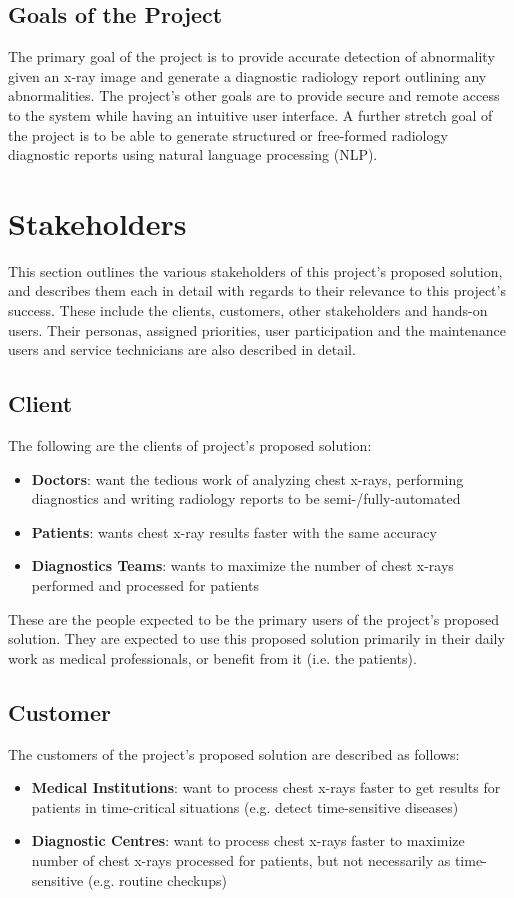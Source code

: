 \documentclass[12pt]{article}
\begin{document}
\subsection{Goals of the Project}
The primary goal of the project is to provide accurate detection of abnormality given an x-ray image and generate a diagnostic radiology report outlining any abnormalities. The project's other goals are to provide secure and remote access to the system while having an intuitive user interface. A further stretch goal of the project is to be able to generate structured or free-formed radiology diagnostic reports using natural language processing (NLP).

\section{Stakeholders}
This section outlines the various stakeholders of this project's proposed solution, and describes them each in detail with regards to their relevance to this project's success. These include the clients, customers, other stakeholders and hands-on users. Their personas, assigned priorities, user participation and the maintenance users and service technicians are also described in detail.

\subsection{Client}
The following are the clients of project's proposed solution:
\begin{itemize}
    \item \textbf{Doctors}: want the tedious work of analyzing chest x-rays, performing diagnostics and writing radiology reports to be semi-/fully-automated
    \item \textbf{Patients}: wants chest x-ray results faster with the same accuracy
    \item \textbf{Diagnostics Teams}: wants to maximize the number of chest x-rays performed and processed for patients
\end{itemize}
These are the people expected to be the primary users of the project's proposed solution. They are expected to use this proposed solution primarily in their daily work as medical professionals, or benefit from it (i.e. the patients).

\subsection{Customer}
The customers of the project's proposed solution are described as follows:
\begin{itemize}
    \item \textbf{Medical Institutions}: want to process chest x-rays faster to get results for patients in time-critical situations (e.g. detect time-sensitive diseases)
    \item \textbf{Diagnostic Centres}: want to process chest x-rays faster to maximize number of chest x-rays processed for patients, but not necessarily as time-sensitive (e.g. routine checkups)
\end{itemize}
\end{document}
